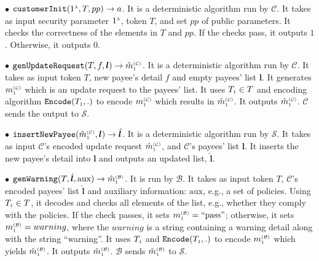 \begin{definition}
\vspace{2mm}
\item[$\bullet$] $\mathtt{customerInit} (1^{\scriptscriptstyle \lambda}, T, pp)\rightarrow a$. It is a deterministic  algorithm run by  $\mathcal{C}$. It takes as input security parameter $1^{\scriptscriptstyle \lambda}$,  token $T$, and  set $pp$ of public parameters. It checks the correctness of the elements in $T$ and $pp$. If the checks pass, it outputs $1$. Otherwise, it outputs $0$. 

\vspace{2mm}
\item [$\bullet$] $\mathtt{genUpdateRequest}(T, f, {\bm l})\rightarrow \hat m^{\scriptscriptstyle\mathcal{(C)}}_{\scriptscriptstyle 1}$.  It is a deterministic algorithm run by $\mathcal{C}$.  It takes as input token $T$,  new payee's detail $f$ and empty payees' list $ {\bm l}$. It  generates $m^{\scriptscriptstyle\mathcal{(C)}}_{\scriptscriptstyle 1}$ which is an  update request to the payees' list. It uses $T_{\scriptscriptstyle 1}\in T$ and encoding algorithm $\mathtt{Encode}(T_{\scriptscriptstyle 1}, .)$ to encode $m^{\scriptscriptstyle\mathcal{(C)}}_{\scriptscriptstyle 1}$ which results in $\hat {m}^{\scriptscriptstyle\mathcal{(C)}}_{\scriptscriptstyle 1}$. It outputs $\hat  m^{\scriptscriptstyle\mathcal{(C)}}_{\scriptscriptstyle 1}$. $\mathcal{C}$ sends the output to $\mathcal{S}$.
%
\vspace{2mm}
\item [$\bullet$] $\mathtt{insertNewPayee}(\hat{m}^{\scriptscriptstyle\mathcal{(C)}}_{\scriptscriptstyle 1}, {\bm l})\rightarrow  \hat{\bm l}$. It is a deterministic algorithm run by $\mathcal{S}$. It takes as input $\mathcal{C}$'s encoded update request  $\hat{m}^{\scriptscriptstyle\mathcal{(C)}}_{\scriptscriptstyle 1}$, and $\mathcal{C}$'s payees' list ${\bm l}$. It inserts the new payee's detail into ${\bm l}$ and outputs an updated list, $\hat{\bm l}$.
%
\vspace{2mm}
\item  [$\bullet$] $\mathtt{genWarning}(T, \hat{\bm l}, \text{aux})\rightarrow \hat m^{\scriptscriptstyle\mathcal{(B)}}_{\scriptscriptstyle1}$. It is run by $\mathcal{B}$. It takes as input token $T$, $\mathcal{C}$'s encoded   payees' list $ \hat{\bm l}$ and auxiliary information: $\text{aux}$, e.g., a set of policies. Using $T_{\scriptscriptstyle 1}\in T$, it decodes and checks  all elements of the list, e.g., whether they comply with the policies. If the check  passes,  it sets $m^{\scriptscriptstyle\mathcal{(B)}}_{\scriptscriptstyle1}=\text{``pass''}$; otherwise, it sets $m^{\scriptscriptstyle\mathcal{(B)}}_{\scriptscriptstyle1}={warning}$, where the $warning$ is a string  containing a warning detail along with
the string ``warning''. It uses  $T_{\scriptscriptstyle 1}$ and $\mathtt{Encode}(T_{\scriptscriptstyle 1}, .)$ to encode $m^{\scriptscriptstyle\mathcal{(B)}}_{\scriptscriptstyle1}$ which yields $\hat m^{\scriptscriptstyle\mathcal{(B)}}_{\scriptscriptstyle1}$. It outputs  $\hat m^{\scriptscriptstyle\mathcal{(B)}}_{\scriptscriptstyle1}$.  $\mathcal{B}$ sends $\hat m^{\scriptscriptstyle\mathcal{(B)}}_{\scriptscriptstyle1}$ to $\mathcal{S}$.

\end{definition}
